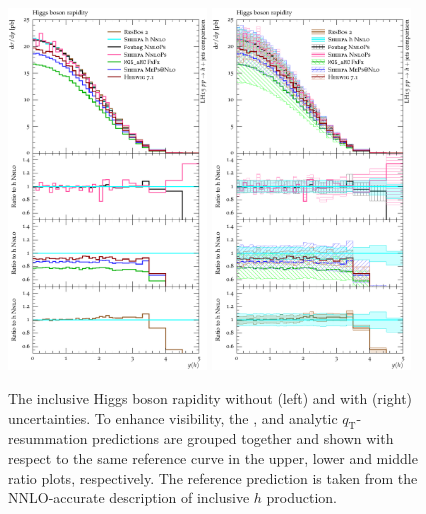 \begin{figure}[t!]
  \centering
  \includegraphics[width=0.47\textwidth]{figures/hjetscomp_u_H_y.pdf}
  \hfill
  \includegraphics[width=0.47\textwidth]{figures/hjetscomp_H_y.pdf}
  \caption{\label{fig:hjetscomp:results:inclobs:hy}%
    The inclusive Higgs boson rapidity without (left) and with (right)
    uncertainties. To enhance visibility, the \NNLOPS, \MEPSatNLO and
    analytic $q_\text{T}$-resummation predictions are grouped together and
    shown with respect to the same reference curve in the upper, lower
    and middle ratio plots, respectively. The reference prediction is
    taken from the NNLO-accurate description of inclusive $h$ production.}
\end{figure}

